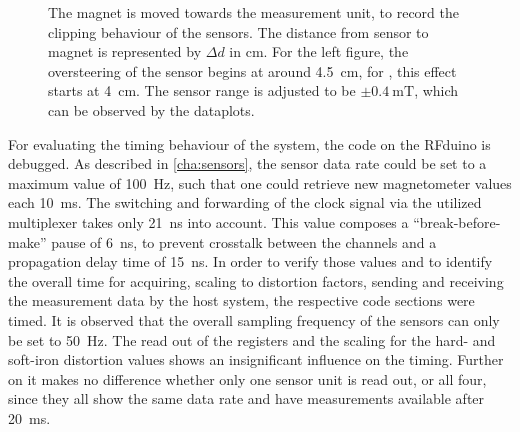 \begin{figure}[!htb]
\hfill
{}
\caption[Clipping behaviour of sensor]
{The magnet is moved towards the measurement unit, to record the clipping behaviour of the sensors. The distance from sensor to magnet is represented by $ \Delta d $ in \si{\cm}. For the left figure, the oversteering of the sensor begins at around \SI{4.5}{\cm}, for \label{fig:posClip}, this effect starts at \SI{4}{\cm}. The sensor range is adjusted to be $ \pm \SI{0.4}{\milli \tesla} $, which can be observed by the dataplots.}
\label{fig:clipping}
\end{figure}
For evaluating the timing behaviour of the system, the code on the RFduino is debugged. As described in \ref{cha:sensors}, the sensor data rate could be set to a maximum value of \SI{100}{\Hz}, such that one could retrieve new magnetometer values each \SI{10}{\milli \second}. The switching and forwarding of the clock signal via the utilized multiplexer takes only \SI{21}{\nano\second} into account. This value composes a ``break-before-make'' pause of \SI{6}{\nano \second}, to prevent crosstalk between the channels and a propagation delay time of \SI{15}{\nano \second}. In order to verify those values and to identify the overall time for acquiring, scaling to distortion factors, sending and receiving the measurement data by the host system, the respective code sections were timed. It is observed that the overall sampling frequency of the sensors can only be set to \SI{50}{\Hz}. The read out of the registers and the scaling for the hard- and soft-iron distortion values shows an insignificant influence on the timing. Further on it makes no difference whether only one sensor unit is read out, or all four, since they all show the same data rate and have measurements available after \SI{20}{\milli \second}.\\
